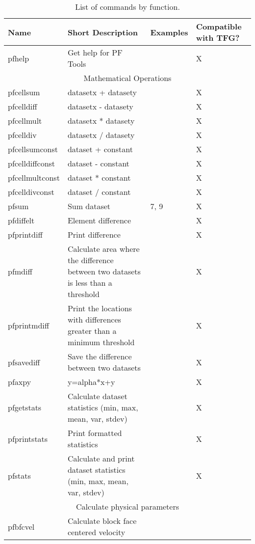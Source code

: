 \small{
\begin{table} \center
\caption{List of \pftools{} commands by function.}

\begin{tabular}{ | p{3cm} | p{6cm} | p{2cm} | p{3cm} | }
\hline
	\bf{Name} & \bf{Short Description} & \bf{Examples} & \bf{Compatible with TFG?} \\ \hline
	pfhelp & Get help for PF Tools &  & X \\ \hline
	\multicolumn{4}{|c|}{Mathematical Operations }   \\ \hline
	pfcellsum & datasetx + datasety &  & X \\ \hline
	pfcelldiff & datasetx - datasety &  & X \\ \hline
	pfcellmult & datasetx   * datasety &  & X  \\ \hline
	pfcelldiv & datasetx / datasety &  & X \\ \hline
	pfcellsumconst & dataset + constant &  & X \\ \hline
	pfcelldiffconst & dataset - constant &  & X \\ \hline
	pfcellmultconst & dataset * constant &  & X \\ \hline
	pfcelldivconst & dataset / constant &  & X \\ \hline
	pfsum & Sum dataset & 7, 9 & X \\ \hline
	pfdiffelt & Element difference &  & X \\ \hline
	pfprintdiff & Print difference &  & X \\ \hline
	pfmdiff & Calculate area where the difference between two datasets is less than a threshold &  & X  \\ \hline
	pfprintmdiff & Print the locations with differences greater than a minimum threshold &  & X  \\ \hline
	pfsavediff & Save the difference between two datasets &  & X \\ \hline
	pfaxpy & y=alpha*x+y &  & X  \\ \hline
	pfgetstats & Calculate dataset statistics (min, max, mean, var, stdev) &  & X \\ \hline
	pfprintstats & Print formatted statistics &  & X \\ \hline
	pfstats & Calculate and print dataset statistics (min, max, mean, var, stdev) &  & X  \\ \hline
	\multicolumn{4}{|c|}{Calculate physical parameters}   \\ \hline
	pfbfcvel & Calculate block face centered velocity &  &   \\ \hline

\end{tabular}
\end{table}}
